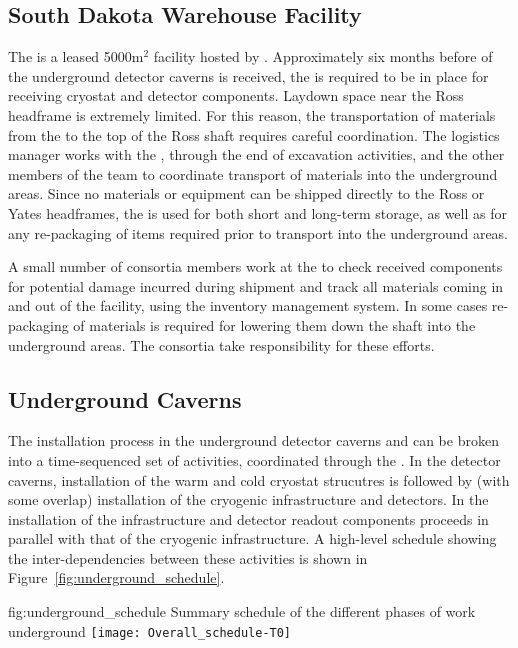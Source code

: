 \subsection{South Dakota Warehouse Facility}
\label{sec:sdwf}

The  is a leased 5000m$^2$ facility hosted by 
.  Approximately six months before 
of the underground detector caverns is received, the  
is required to be in place for receiving cryostat and detector 
components.  Laydown space near the Ross headframe is extremely 
limited.  For this reason, the transportation of materials from 
the  to the top of the Ross shaft requires careful 
coordination. The  logistics manager works 
with the , through the end of excavation activities, 
and the other members of the  team to coordinate transport 
of materials into the underground areas.  Since no materials or 
equipment can be shipped directly to the Ross or Yates headframes, 
the  is used for both short and long-term storage, as 
well as for any re-packaging of items required prior to transport 
into the underground areas. 

A small number of  consortia members work at the
 to check received components for potential damage
incurred during shipment and track all materials coming in and out of
the facility, using the inventory management system.  In some cases
re-packaging of materials is required for lowering them down the shaft
into the underground areas.  The  consortia take
responsibility for these efforts.

\subsection{Underground Caverns}

The installation 
process in the underground detector caverns and  can 
be broken into a time-sequenced set of activities, coordinated 
through the .  In the detector caverns, installation 
of the warm and cold cryostat strucutres is followed by (with 
some overlap) installation of the cryogenic infrastructure and 
detectors.  In the  installation of the   
infrastructure and detector readout components proceeds in 
parallel with that of the cryogenic infrastructure.  A high-level 
schedule showing the inter-dependencies between these activities 
is shown in Figure~\ref{fig:underground_schedule}.
\begin{dunefigure}{fig:underground_schedule}
  {Summary schedule of the different phases of work underground}
  \texttt{[image: Overall\_schedule-T0]}
\end{dunefigure}

